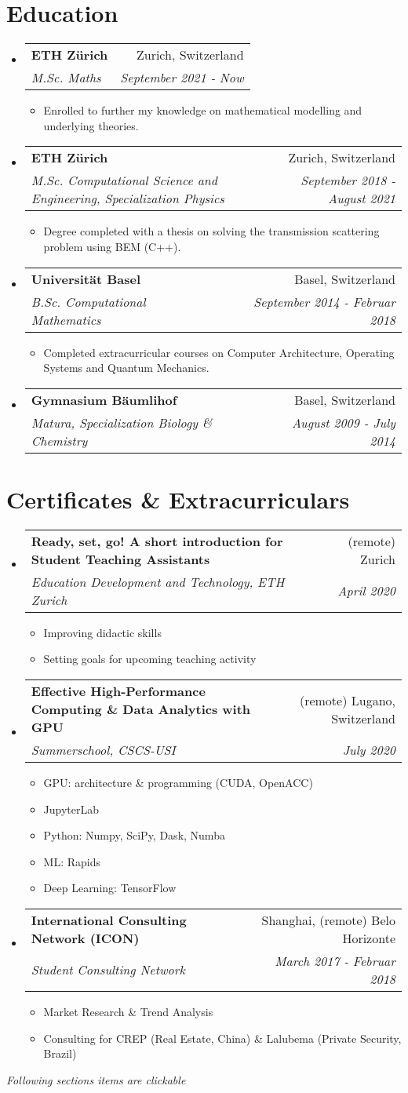 \documentclass[letterpaper,11pt]{article}
\makeatletter
\newcommand{\resumeItem}[1]{%
\item\small{
		#1
	}
}
\newcommand{\resumeSubheading}[4]{
	\vspace{8pt}\item%
	\begin{tabular*}{0.97\textwidth}[t]{l@{\extracolsep{\fill}}r}
		\textbf{#1} & #2 \\
		\textit{\small#3} & \textit{\small #4} \\
	\end{tabular*}\vspace{-5pt}
}
\newcommand{\resumeSubHeadingListStart}{\begin{itemize}[leftmargin=*]}
\newcommand{\resumeSubHeadingListEnd}{\end{itemize}}
\newcommand{\resumeItemListStart}{\begin{itemize}}
\newcommand{\resumeItemListEnd}{\end{itemize}\vspace{-5pt}}
\makeatother
\begin{document}
\section{Education}
\resumeSubHeadingListStart
\resumeSubheading
{ETH Zürich}{Zurich, Switzerland}
{M.Sc. Maths}{September 2021 - Now}
\resumeItemListStart
\resumeItem{Enrolled to further my knowledge on mathematical modelling and underlying theories.}
\resumeItemListEnd
\resumeSubheading
{ETH Zürich}{Zurich, Switzerland}
{M.Sc. Computational Science and Engineering, Specialization Physics}{September 2018 - August 2021}
\resumeItemListStart
\resumeItem{Degree completed with a thesis on solving the transmission scattering problem using BEM (C++).}
\resumeItemListEnd
\resumeSubheading
{Universität Basel}{Basel, Switzerland}
{B.Sc. Computational Mathematics}{September 2014 - Februar 2018}
\resumeItemListStart
\resumeItem{Completed extracurricular courses on Computer Architecture, Operating Systems and Quantum Mechanics.}
\resumeItemListEnd
\resumeSubheading
{Gymnasium Bäumlihof}{Basel, Switzerland}
{Matura, Specialization Biology \& Chemistry}{August 2009 - July 2014}
\resumeSubHeadingListEnd


\section{Certificates \& Extracurriculars}
\resumeSubHeadingListStart
\resumeSubheading
{Ready, set, go! A short introduction for Student
Teaching Assistants}{(remote) Zurich}
{Education Development and Technology, ETH Zurich}{April 2020}
\resumeItemListStart
\resumeItem{Improving didactic skills}
\resumeItem{Setting goals for upcoming teaching activity}
\resumeItemListEnd
\resumeSubheading
{Effective High-Performance Computing \& Data Analytics with GPU}{(remote) Lugano, Switzerland}
{Summerschool, CSCS-USI}{July 2020}
\resumeItemListStart
\resumeItem{GPU: architecture \& programming (CUDA, OpenACC)}
\resumeItem{JupyterLab}
\resumeItem{Python: Numpy, SciPy, Dask, Numba}
\resumeItem{ML: Rapids}
\resumeItem{Deep Learning: TensorFlow}
\resumeItemListEnd
\resumeSubheading
{International Consulting Network (ICON)}{Shanghai, (remote) Belo Horizonte}
{Student Consulting Network}{March 2017 - Februar 2018}
\resumeItemListStart
\resumeItem{Market Research \& Trend Analysis}
\resumeItem{Consulting for CREP (Real Estate, China) \& Lalubema (Private Security, Brazil)}
\resumeItemListEnd
\resumeSubHeadingListEnd

\hfill \textsl{Following sections items are clickable}
\end{document}
